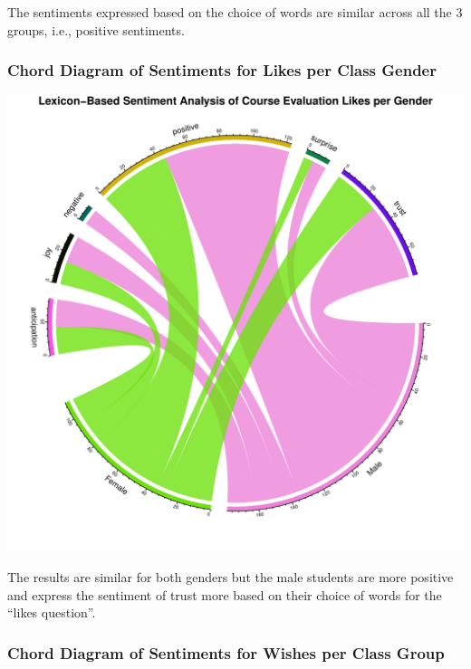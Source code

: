 \documentclass[
]{article}
\begin{document}
The sentiments expressed based on the choice of words are similar across
all the 3 groups, i.e., positive sentiments.

\newpage

\subsubsection{Chord Diagram of Sentiments for Likes per Class
Gender}\label{chord-diagram-of-sentiments-for-likes-per-class-gender}

\includegraphics{Mid-SemesterCourseEvaluation-20240819-20241125-ADB-BBIT2.2_files/figure-latex/ChordDiagramLikesPerGender-1.pdf}

The results are similar for both genders but the male students are more
positive and express the sentiment of trust more based on their choice
of words for the ``likes question''.

\newpage

\subsubsection{Chord Diagram of Sentiments for Wishes per Class
Group}\label{chord-diagram-of-sentiments-for-wishes-per-class-group}
\end{document}
